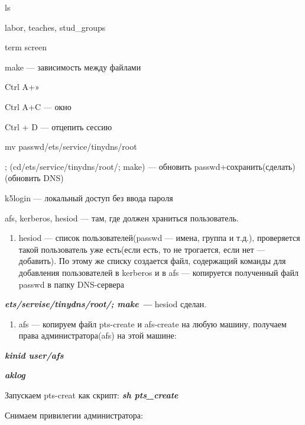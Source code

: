 \par 
ls
\par 
labor, teaches, stud\_groups
\par 
term screen
\par 
make — зависимость между файлами
\par Ctrl
A+»
\par 
Ctrl A+C — окно 

\par 
Ctrl + D — отцепить сессию
\par 
mv passwd/ets/service/tinydns/root
\par 
; (cd/ets/service/tinydns/root/; make) — обновить
passwd+сохранить(сделать)(обновить DNS)
\par 
k5login — локальный доступ без ввода
пароля
\par 
afs, kerberos, hesiod — там, где должен
храниться пользователь.
\begin{enumerate}
	\item \par 
	hesiod — список пользователей(passwd
	— имена, группа и т.д.), проверяется
	такой пользователь уже есть(если есть,
	то не трогается, если нет — добавить).
	По этому же списку создается файл,
	содержащий команды для добавления
	пользователей в kerberos и в afs — копируется
	полученный файл passwd в папку DNS-сервера
\end{enumerate}
\par 
\textit{\textbf{ets/servise/tinydns/root/;
make —}}
hesiod сделан.
\begin{enumerate}
	\item \par 
	afs
	— копируем файл pts-create и afs-create на любую
	машину, получаем права администратора(afs)
	на этой машине:
\end{enumerate}
\par 
\textit{\textbf{kinid user/afs}}
\par 
\textit{\textbf{aklog}}
\par 
Запускаем
pts-creat как скрипт: \textit{\textbf{sh
pts\_create}}
\par 
Снимаем привилегии администратора:


